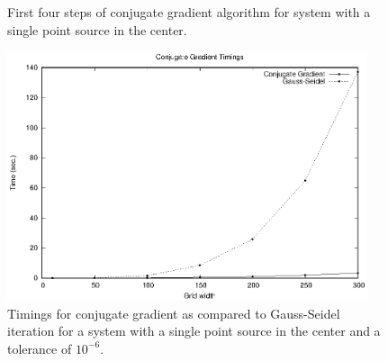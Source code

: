 \documentclass[paper=a4, fontsize=11pt]{scrartcl} %
\numberwithin{equation}{section} %
\numberwithin{figure}{section} %
\numberwithin{table}{section} %
\begin{document}
\begin{figure}
\centering
{}
\hfill
{}
\caption{First four steps of conjugate gradient algorithm for system with a single point source in the center.}
\label{fig:cgsteps}
\end{figure}

\begin{figure}
\centering
\includegraphics[width=400px]{cg_timings.eps}
\caption{Timings for conjugate gradient as compared to Gauss-Seidel iteration for a system with a single point source in the center and a tolerance of $10^{-6}$.}
\label{fig:cgtimings}
\end{figure}
\end{document}
